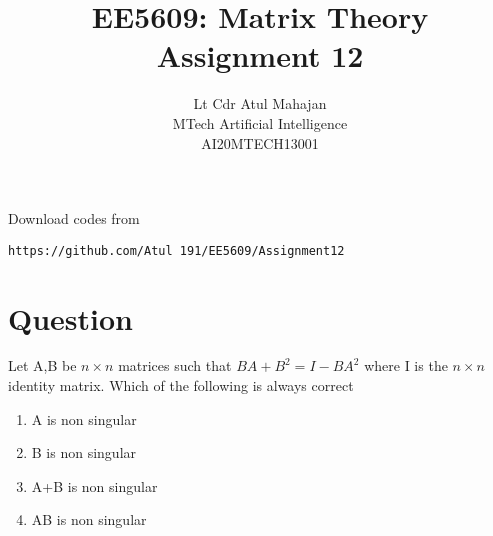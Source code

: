 \documentclass[journal,12pt,onecolumn]{IEEEtran}
\begin{document}
     \def\rightbox#1{\makebox[0in][r]{#1}}
     \def\centbox#1{\makebox[0in]{#1}}
     \def\topbox#1{\raisebox{-\baselineskip}[0in][0in]{#1}}
     \def\midbox#1{\raisebox{-0.5\baselineskip}[0in][0in]{#1}}
\vspace{3cm}
\onecolumn
\title{EE5609: Matrix Theory\\
          Assignment 12\\}
\author{Lt Cdr Atul Mahajan\\MTech Artificial Intelligence\\AI20MTECH13001 }
\maketitle
\bigskip
\renewcommand{\thefigure}{\theenumi}
\renewcommand{\thetable}{\theenumi}
Download codes from 
%
\begin{lstlisting}
https://github.com/Atul 191/EE5609/Assignment12
\end{lstlisting}
%
 
\section{Question}
Let A,B be $n \times n$ matrices such that $BA+ B^2= I-BA^2$ where I is the $n\times n$ identity matrix. Which of the following is always correct
\begin{enumerate}
    \item A is non singular
    \item B is non singular
    \item A+B is non singular
    \item AB is non singular
\end{enumerate}
%
\end{document}
